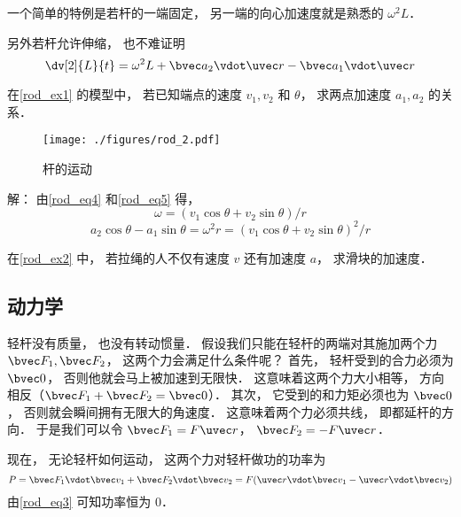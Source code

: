 一个简单的特例是若杆的一端固定， 另一端的向心加速度就是熟悉的 $\omega^2L$．

另外若杆允许伸缩， 也不难证明
\begin{equation}
\dv[2]{L}{t} = \omega^2 L + \bvec a_2 \vdot \uvec r - \bvec a_1 \vdot \uvec r
\end{equation}


\begin{example}{}
在\autoref{rod_ex1} 的模型中， 若已知端点的速度 $v_1, v_2$ 和 $\theta$， 求两点加速度 $a_1, a_2$ 的关系．
\begin{figure}[ht]
\centering
\texttt{[image: ./figures/rod\_2.pdf]}
\caption{杆的运动} \label{rod_fig2}
\end{figure}

解： 由\autoref{rod_eq4} 和\autoref{rod_eq5} 得，
\begin{equation}
\omega = (v_1 \cos\theta + v_2 \sin\theta)/r
\end{equation}
\begin{equation}
a_2 \cos\theta - a_1 \sin\theta = \omega^2 r = (v_1 \cos\theta + v_2 \sin\theta)^2/r
\end{equation}
\end{example}

\begin{exercise}{}
在\autoref{rod_ex2} 中， 若拉绳的人不仅有速度 $v$ 还有加速度 $a$， 求滑块的加速度．
\end{exercise}

\subsection{动力学}
轻杆没有质量， 也没有转动惯量． 假设我们只能在轻杆的两端对其施加两个力 $\bvec F_1, \bvec F_2$， 这两个力会满足什么条件呢？ 首先， 轻杆受到的合力必须为 $\bvec 0$， 否则他就会马上被加速到无限快． 这意味着这两个力大小相等， 方向相反（$\bvec F_1 + \bvec F_2 = \bvec 0$）． 其次， 它受到的和力矩必须也为 $\bvec 0$， 否则就会瞬间拥有无限大的角速度． 这意味着两个力必须共线， 即都延杆的方向． 于是我们可以令 $\bvec F_1 = F \uvec r$， $\bvec F_2 = -F \uvec r$．

现在， 无论轻杆如何运动， 这两个力对轻杆做功的功率为
\begin{equation}
P = \bvec F_1 \vdot \bvec v_1 + \bvec F_2 \vdot \bvec v_2 = F (\uvec r \vdot \bvec v_1 - \uvec r \vdot \bvec v_2)
\end{equation}
由\autoref{rod_eq3} 可知功率恒为 0．
